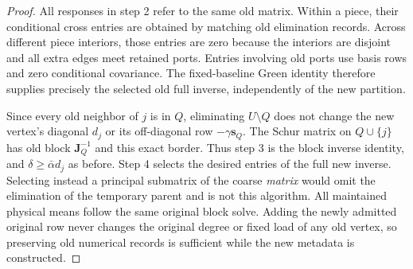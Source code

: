 \begin{proof}
All responses in step 2 refer to the same old matrix. Within a piece,
their conditional cross entries are obtained by matching old elimination
records. Across different piece interiors, those entries are zero because
the interiors are disjoint and all extra edges meet retained ports.
Entries involving old ports use basis rows and zero conditional covariance.
The fixed-baseline Green identity therefore supplies precisely the selected
old full inverse, independently of the new partition.

Since every old neighbor of $j$ is in $Q$, eliminating $U\setminus Q$
does not change the new vertex's diagonal $d_j$ or its off-diagonal row
$-\gamma\boldsymbol s_Q$. The Schur matrix on $Q\cup\{j\}$ has old
block $\boldsymbol J_Q^{-1}$ and this exact border. Thus step 3 is the
block inverse identity, and $\delta\geq\bar\alpha d_j$ as before.
Step 4 selects the desired entries of the full new inverse. Selecting
instead a principal submatrix of the coarse \emph{matrix} would omit
the elimination of the temporary parent and is not this algorithm.
All maintained physical means follow the same original block solve.
Adding the newly admitted original row never changes the original degree
or fixed load of any old vertex, so preserving old numerical records is
sufficient while the new metadata is constructed.
\end{proof}


